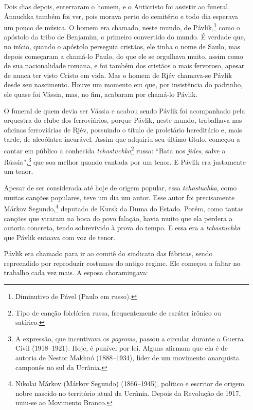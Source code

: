 Dois dias depois, enterraram o homem, e o Anticristo foi assistir ao
funeral. Ánnuchka também foi ver, pois morava perto do cemitério e todo
dia esperava um pouco de música. O homem era chamado, neste mundo, de
Pávlik,\footnote{Diminutivo de Pável (Paulo em russo).} como o apóstolo
da tribo de Benjamim, o primeiro convertido do mundo. É verdade que, no
início, quando o apóstolo perseguia cristãos, ele tinha o nome de Saulo,
mas depois começaram a chamá-lo Paulo, do que ele se orgulhava muito,
assim como de sua nacionalidade romana, e foi também dos cristãos o mais
fervoroso, apesar de nunca ter visto Cristo em vida. Mas o homem de Rjév
chamava-se Pávlik desde seu nascimento. Houve um momento em que, por
insistência do padrinho, ele quase foi Vássia, mas, no fim, acabaram por
chamá-lo Pávlik.

O funeral de quem devia ser Vássia e acabou sendo Pávlik foi acompanhado
pela orquestra do clube dos ferroviários, porque Pávlik, neste mundo,
trabalhava nas oficinas ferroviárias de Rjév, possuindo o título de
proletário hereditário e, mais tarde, de alcoólatra incurável. Assim que
adquiriu seu último título, começou a cantar em público a conhecida
\emph{tchastuchka}\footnote{Tipo de canção folclórica russa,
  frequentemente de caráter irônico ou satírico.} russa: ``Bata nos
\emph{jides}, salve a Rússia'',\footnote{A expressão, que incentivava os
  \emph{pogroms}, passou a circular durante a Guerra Civil
  (1918\emph{--}1921). Hoje, é punível por lei. Alguns afirmam que ela é
  de autoria de Nestor Makhnó (1888\emph{--}1934), líder de um movimento
  anarquista camponês no sul da Ucrânia.} que soa melhor quando cantada
por um tenor. E Pávlik era justamente um tenor.

Apesar de ser considerada até hoje de origem popular, essa
\emph{tchastuchka}, como muitas canções populares, teve um dia um autor.
Esse autor foi precisamente Márkov Segundo,\footnote{Nikolai Márkov
  (Márkov Segundo) (1866\emph{--}1945), político e escritor de origem
  nobre nascido no território atual da Ucrânia. Depois da Revolução de
  1917, uniu-se ao Movimento Branco.} deputado de Kursk da Duma do
Estado. Porém, como tantas canções que viraram na boca do povo falação,
havia muito que ela perdera a autoria concreta, tendo sobrevivido à
prova do tempo. E essa era a \emph{tchastuchka} que Pávlik entoava com
voz de tenor.

Pávlik era chamado para ir ao comitê do sindicato das fábricas, sendo
repreendido por reproduzir costumes do antigo regime. Ele começou a
faltar no trabalho cada vez mais. A esposa choramingava:

